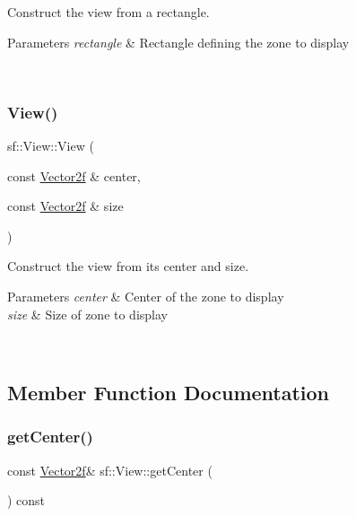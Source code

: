 Construct the view from a rectangle. 


\begin{DoxyParams}{Parameters}
{\em rectangle} & Rectangle defining the zone to display \begin{DoxyVerb}\end{DoxyVerb}
 \\
\hline
\end{DoxyParams}
\mbox{\label{classsf_1_1_view_afdaf84cfc910ef160450d63603457ea4}} 
\subsubsection{\texorpdfstring{View()}{View()}\hspace{0.1cm}{\footnotesize\ttfamily [3/3]}}
{\footnotesize\ttfamily sf\+::\+View\+::\+View (\begin{DoxyParamCaption}\item[{const \mbox{\hyperlink{classsf_1_1_vector2}{Vector2f}} \&}]{center,  }\item[{const \mbox{\hyperlink{classsf_1_1_vector2}{Vector2f}} \&}]{size }\end{DoxyParamCaption})}



Construct the view from its center and size. 


\begin{DoxyParams}{Parameters}
{\em center} & Center of the zone to display \\
\hline
{\em size} & Size of zone to display \begin{DoxyVerb}\end{DoxyVerb}
 \\
\hline
\end{DoxyParams}


\subsection{Member Function Documentation}
\mbox{\label{classsf_1_1_view_a7f4443c194c691ae4dcf8fd9dd0eaa46}} 
\subsubsection{\texorpdfstring{getCenter()}{getCenter()}}
{\footnotesize\ttfamily const \mbox{\hyperlink{classsf_1_1_vector2}{Vector2f}}\& sf\+::\+View\+::get\+Center (\begin{DoxyParamCaption}{ }\end{DoxyParamCaption}) const}



